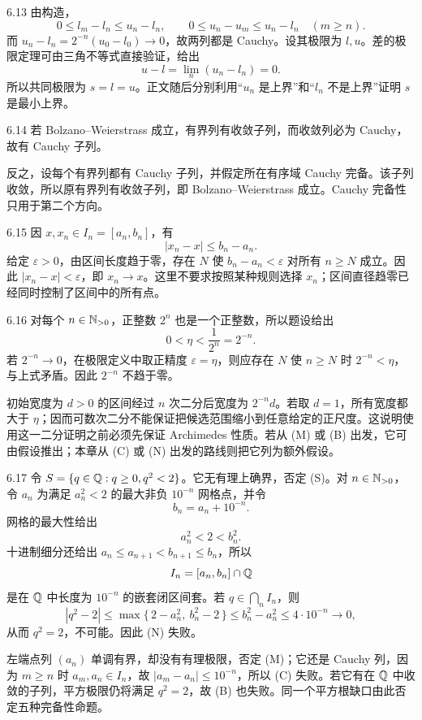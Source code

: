 \begin{solution}{6.13}
由构造，
\[
 0\le l_m-l_n\le u_n-l_n,\qquad
 0\le u_n-u_m\le u_n-l_n\quad(m\ge n).
\]
而 \(u_n-l_n=2^{-n}(u_0-l_0)\to0\)，故两列都是 Cauchy。设其极限为 \(l,u\)。差的极限定理可由三角不等式直接验证，给出
\[
 u-l=\lim_n(u_n-l_n)=0.
\]
所以共同极限为 \(s=l=u\)。正文随后分别利用“\(u_n\) 是上界”和“\(l_n\) 不是上界”证明 \(s\) 是最小上界。
\end{solution}

\begin{solution}{6.14}
若 Bolzano--Weierstrass 成立，有界列有收敛子列，而收敛列必为 Cauchy，故有 Cauchy 子列。

反之，设每个有界列都有 Cauchy 子列，并假定所在有序域 Cauchy 完备。该子列收敛，所以原有界列有收敛子列，即 Bolzano--Weierstrass 成立。Cauchy 完备性只用于第二个方向。
\end{solution}

\begin{solution}{6.15}
因 \(x,x_n\in I_n=[a_n,b_n]\)，有
\[
 |x_n-x|\le b_n-a_n.
\]
给定 \(\varepsilon>0\)，由区间长度趋于零，存在 \(N\) 使 \(b_n-a_n<\varepsilon\) 对所有 \(n\ge N\) 成立。因此 \(|x_n-x|<\varepsilon\)，即 \(x_n\to x\)。这里不要求按照某种规则选择 \(x_n\)；区间直径趋零已经同时控制了区间中的所有点。
\end{solution}

\begin{solution}{6.16}
对每个 \(n\in\mathbb{N}_{>0}\)，正整数 \(2^n\) 也是一个正整数，所以题设给出
\[
 0<\eta<\frac1{2^n}=2^{-n}.
\]
若 \(2^{-n}\to0\)，在极限定义中取正精度 \(\varepsilon=\eta\)，则应存在 \(N\) 使 \(n\ge N\) 时 \(2^{-n}<\eta\)，与上式矛盾。因此 \(2^{-n}\) 不趋于零。

初始宽度为 \(d>0\) 的区间经过 \(n\) 次二分后宽度为 \(2^{-n}d\)。若取 \(d=1\)，所有宽度都大于 \(\eta\)；因而可数次二分不能保证把候选范围缩小到任意给定的正尺度。这说明使用这一二分证明之前必须先保证 Archimedes 性质。若从 (M) 或 (B) 出发，它可由假设推出；本章从 (C) 或 (N) 出发的路线则把它列为额外假设。
\end{solution}

\begin{solution}{6.17}
令 \(S=\{q\in\mathbb{Q}:q\ge0,q^2<2\}\)。它无有理上确界，否定 (S)。对 \(n\in\mathbb{N}_{>0}\)，令 \(a_n\) 为满足 \(a_n^2<2\) 的最大非负 \(10^{-n}\) 网格点，并令
\[
 b_n=a_n+10^{-n}.
\]
网格的最大性给出
\[
 a_n^2<2<b_n^2.
\]
十进制细分还给出 \(a_n\le a_{n+1}<b_{n+1}\le b_n\)，所以
\[
 I_n=[a_n,b_n]\cap\mathbb{Q}
\]
是在 \(\mathbb{Q}\) 中长度为 \(10^{-n}\) 的嵌套闭区间套。若 \(q\in\bigcap_n I_n\)，则
\[
 |q^2-2|
 \le \max\{\,2-a_n^2,\ b_n^2-2\,\}
 \le b_n^2-a_n^2
 \le 4\cdot10^{-n}\longrightarrow0,
\]
从而 \(q^2=2\)，不可能。因此 (N) 失败。

左端点列 \((a_n)\) 单调有界，却没有有理极限，否定 (M)；它还是 Cauchy 列，因为 \(m\ge n\) 时 \(a_m,a_n\in I_n\)，故 \(|a_m-a_n|\le10^{-n}\)，所以 (C) 失败。若它有在 \(\mathbb{Q}\) 中收敛的子列，平方极限仍将满足 \(q^2=2\)，故 (B) 也失败。同一个平方根缺口由此否定五种完备性命题。
\end{solution}


